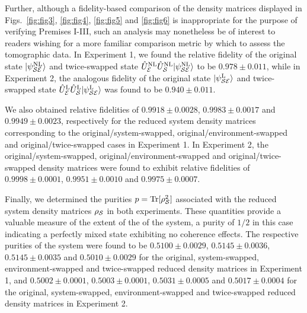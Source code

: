 \documentclass[12pt]{iopart}
\begin{document}
Further, although a fidelity-based comparison of the density matrices displayed in Figs.~\ref{fig:fig3}, \ref{fig:fig4}, \ref{fig:fig5} and \ref{fig:fig6} is inappropriate for the purpose of verifying Premises I-III, such an analysis may nonetheless be of interest to readers wishing for a more familiar comparison metric by which to assess the tomographic data. In Experiment 1, we found the relative fidelity of the original state $|\psi^\mathrm{NL}_{\cal SE}\rangle$ and twice-swapped state $\hat{U}^\mathrm{NL}_{\cal E}\hat{U}^\mathrm{NL}_{\cal S}|\psi^\mathrm{NL}_{\cal SE}\rangle$ to be $0.978 \pm 0.011$, while in Experiment 2, the analogous fidelity of the original state $|\psi^\mathrm{L}_{\cal SE}\rangle$ and twice-swapped state $\hat{U}^\mathrm{L}_{\cal E}\hat{U}^\mathrm{L}_{\cal S}|\psi^\mathrm{L}_{\cal SE}\rangle$ was found to be $0.940 \pm 0.011$. 

We also obtained relative fidelities of $0.9918 \pm 0.0028$, $0.9983 \pm 0.0017$ and $0.9949 \pm 0.0023$, respectively for the reduced system density matrices corresponding to the original/system-swapped, original/environment-swapped and original/twice-swapped cases in Experiment 1. In Experiment 2, the original/system-swapped, original/environment-swapped and original/twice-swapped density matrices were found to exhibit relative fidelities of $0.9998 \pm 0.0001$, $0.9951 \pm 0.0010$ and $0.9975 \pm 0.0007$. 

Finally, we determined the purities $p=\mathrm{Tr}[\rho_{\cal S}^2]$ associated with the reduced system density matrices $\rho_{\cal S}$ in both experiments. These quantities provide a valuable measure of the extent of the  of the system, a purity of $1/2$ in this case indicating a perfectly mixed state exhibiting no coherence effects. The respective purities of the system were found to be $0.5100 \pm 0.0029$, $0.5145 \pm 0.0036$, $0.5145 \pm 0.0035$ and $0.5010 \pm 0.0029$ for the original, system-swapped, environment-swapped and twice-swapped reduced density matrices in Experiment 1, and $0.5002 \pm 0.0001$, $0.5003 \pm 0.0001$, $0.5031 \pm 0.0005$ and $0.5017 \pm 0.0004$ for the original, system-swapped, environment-swapped and twice-swapped reduced density matrices in Experiment 2.

\end{document}
